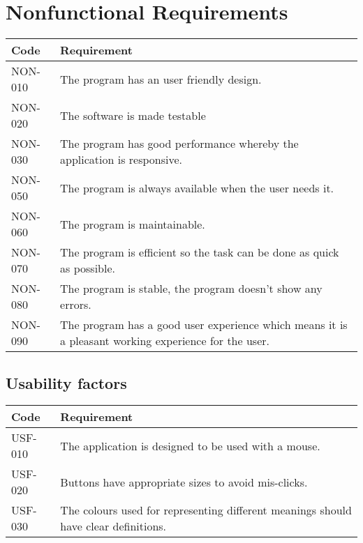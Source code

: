 \chapter{Nonfunctional Requirements}
\begin{tabularx}{\textwidth}{|p{2cm}X|}\hline
Code & Requirement \\\hline
NON-010 & The program has an user friendly design.\\\hline
NON-020 & The software is made testable\\\hline
NON-030 & The program has good performance whereby the application is responsive.\\\hline
NON-050 & The program is always available when the user needs it.\\\hline
NON-060 & The program is maintainable.\\\hline
NON-070 & The program is efficient so the task can be done as quick as possible.\\\hline
NON-080 & The program is stable, the program doesn't show any errors.\\\hline
NON-090 & The program has a good user experience which means it is a pleasant working experience for the user.\\\hline
\end{tabularx}

\section{Usability factors}
\begin{tabularx}{\textwidth}{|p{2cm}X|}\hline
Code & Requirement \\\hline
USF-010 & The application is designed to be used with a mouse.\\\hline
USF-020 & Buttons have appropriate sizes to avoid mis-clicks.\\\hline
USF-030 & The colours used for representing different meanings should have clear definitions.\\\hline
\end{tabularx}
